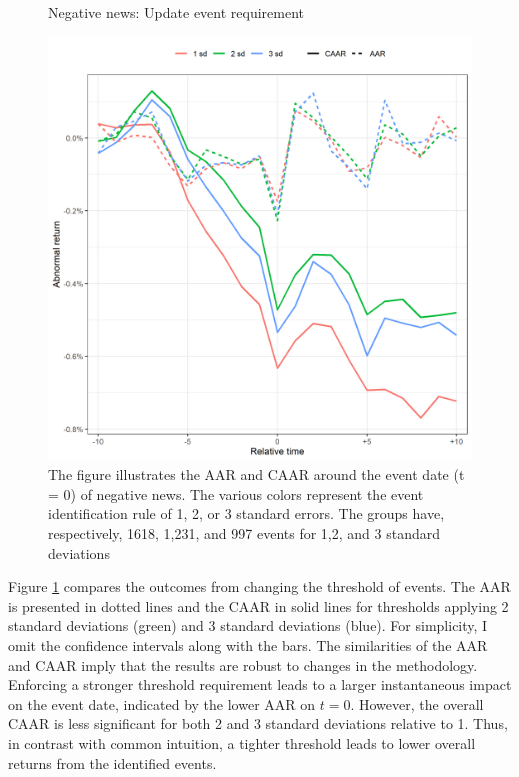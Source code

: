 \begin{figure} [H]
    \centering
    \caption{Negative news: Update event requirement}
    \includegraphics[scale=0.6]{Projekt/1.Figures analysis/ST_negative_sensitivity.png}
     \caption*{\footnotesize The figure illustrates the AAR and CAAR around the event date (t = 0) of negative news. The various colors represent the event identification rule of 1, 2, or 3 standard errors. The groups have, respectively, 1618, 1,231, and 997 events for 1,2, and 3 standard deviations}
    \label{fig:ST_neg_sensitivity}
\end{figure} 

Figure \ref{fig:ST_neg_sensitivity} compares the outcomes from changing the threshold of events. The AAR is presented in dotted lines and the CAAR in solid lines for thresholds applying 2 standard deviations (green) and 3 standard deviations (blue). For simplicity, I omit the confidence intervals along with the bars. The similarities of the AAR and CAAR imply that the results are robust to changes in the methodology. Enforcing a stronger threshold requirement leads to a larger instantaneous impact on the event date, indicated by the lower AAR on $t=0$. However, the overall CAAR is less significant for both 2 and 3 standard deviations relative to 1. Thus, in contrast with common intuition, a tighter threshold leads to lower overall returns from the identified events.  

